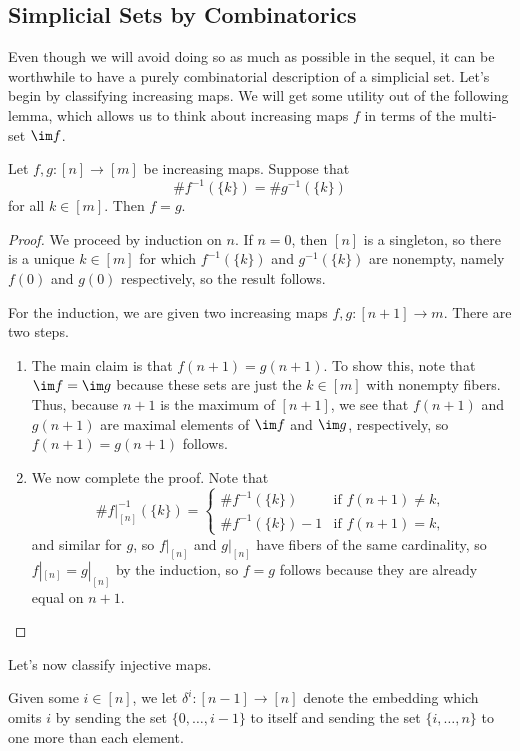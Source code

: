 \documentclass[../notes.tex]{subfiles}
\begin{document}
\subsection{Simplicial Sets by Combinatorics}
Even though we will avoid doing so as much as possible in the sequel, it can be worthwhile to have a purely combinatorial description of a simplicial set. Let's begin by classifying increasing maps. We will get some utility out of the following lemma, which allows us to think about increasing maps $f$ in terms of the multi-set $\im f$.
\begin{lemma} \label{lem:inc-by-fibers}
	Let $f,g\colon[n]\to[m]$ be increasing maps. Suppose that
	\[\#f^{-1}(\{k\})=\#g^{-1}(\{k\})\]
	for all $k\in[m]$. Then $f=g$.
\end{lemma}
\begin{proof}
	We proceed by induction on $n$. If $n=0$, then $[n]$ is a singleton, so there is a unique $k\in[m]$ for which $f^{-1}(\{k\})$ and $g^{-1}(\{k\})$ are nonempty, namely $f(0)$ and $g(0)$ respectively, so the result follows.

	For the induction, we are given two increasing maps $f,g\colon[n+1]\to m$. There are two steps.
	\begin{enumerate}
		\item The main claim is that $f(n+1)=g(n+1)$. To show this, note that $\im f=\im g$ because these sets are just the $k\in[m]$ with nonempty fibers. Thus, because $n+1$ is the maximum of $[n+1]$, we see that $f(n+1)$ and $g(n+1)$ are maximal elements of $\im f$ and $\im g$, respectively, so $f(n+1)=g(n+1)$ follows.
		\item We now complete the proof. Note that
		\[\#f|_{[n]}^{-1}(\{k\})=\begin{cases}
			\#f^{-1}(\{k\}) & \text{if }f(n+1)\ne k, \\
			\#f^{-1}(\{k\})-1 & \text{if }f(n+1)=k,
		\end{cases}\]
		and similar for $g$, so $f|_{[n]}$ and $g|_{[n]}$ have fibers of the same cardinality, so $f|_{[n]}=g|_{[n]}$ by the induction, so $f=g$ follows because they are already equal on $n+1$.
		\qedhere
	\end{enumerate}
\end{proof}
Let's now classify injective maps.
\begin{notation}
	Given some $i\in[n]$, we let $\delta^i\colon[n-1]\to[n]$ denote the embedding which omits $i$ by sending the set $\{0,\ldots,i-1\}$ to itself and sending the set $\{i,\ldots,n\}$ to one more than each element.
\end{notation}
\end{document}

